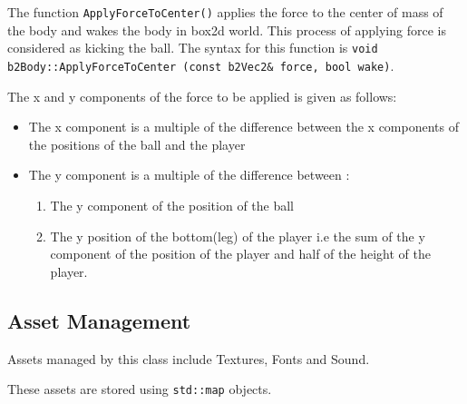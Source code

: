 \documentclass[main]{subfiles}
\begin{document}
The function \texttt{ApplyForceToCenter()} applies the force to the center of mass of the body and wakes the  body in box2d world. This process of applying force is considered as kicking the ball. The syntax for this function is \texttt{void b2Body::ApplyForceToCenter (const b2Vec2\&  force, bool wake)}. 

The x and y components of the force to be applied is given as follows:
\begin{itemize}
    \item The x component is a multiple of the difference between the x components of the positions of the ball and the player
    \item The y component is a multiple of the difference between :
    \begin{enumerate}
        \item The y component of the position of the ball
        \item The y position of the bottom(leg) of the player i.e the sum of the y component of the position of the player and half of the height of the player. 
    \end{enumerate}
\end{itemize}




\subsection{Asset Management}
     Assets managed by this class include Textures, Fonts and Sound.
     
     These assets are stored using \texttt{std::map} objects.
     
\end{document}
